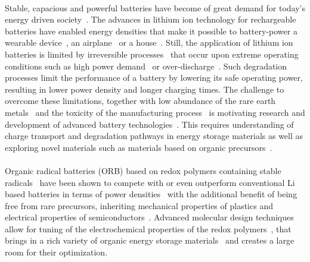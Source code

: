 \paragraph*{}
Stable, capacious and powerful batteries have become of great demand for today's energy driven society~\cite{Yoo2014,Xu2020,Nitta2015}. The advances in lithium ion technology for rechargeable batteries have enabled energy densities that make it possible to battery-power a wearable  device~\cite{Lee2013,Maddikunta2020}, an airplane~\cite{Kadlec2014} or a house~\cite{Diouf2019,Hirasawa2021}. Still, the application of lithium ion batteries is limited by irreversible processes~\cite{Larsson2017,Fu2015,Zhang2021} that occur upon extreme operating conditions such as high power demand~\cite{Zhang2022,Guan2018} or over-discharge~\cite{Ma2020}. Such degradation processes limit the performance of a battery by lowering its safe operating power, resulting in lower power density and longer charging times. The challenge to overcome these limitations, together with low abundance of the rare earth metals~\cite{Xu2020} and the toxicity of the manufacturing process~\cite{Prazanov2022,Peters2017} is motivating research and development of advanced battery technologies~\cite{Degen2022}. This requires understanding of charge transport and degradation pathways in energy storage materials as well as exploring novel materials such as materials based on organic precursors~\cite{Lu2020,Kim2023}.
\paragraph*{}
Organic radical batteries (ORB) based on redox polymers containing stable radicals~\cite{nakahara2002_cpl} have been shown to compete with or even outperform  conventional Li based batteries in terms of power densities~\cite{IWASA2007} with the additional benefit of being free from rare precursors, inheriting mechanical properties of plastics and electrical properties of semiconductors~\cite{friebe2017_topcurrchem,Casado2021,Goujon2021}. Advanced molecular design techniques allow for tuning of the electrochemical properties of the redox polymers~\cite{Janoschka2017}, that brings in a rich variety of organic energy storage materials~\cite{Xie2021,Vereshchagin2022,Janoschka2017a} and creates a large room for their optimization. 
